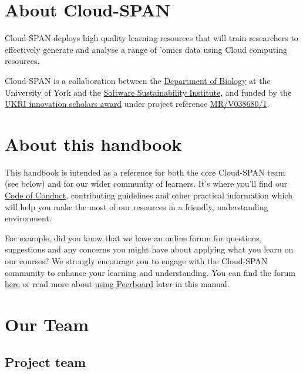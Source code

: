 \documentclass[
]{book}
\begin{document}
\hypertarget{about-cloud-span}{%
\section{About Cloud-SPAN}\label{about-cloud-span}}

Cloud-SPAN deploys high quality learning resources that will train researchers to effectively generate and analyse a range of 'omics data using Cloud computing resources.

Cloud-SPAN is a collaboration between the \href{https://www.york.ac.uk/biology/}{Department of Biology} at the University of York and the \href{https://www.software.ac.uk/}{Software Sustainability Institute}, and funded by the \href{https://www.ukri.org/news/initiatives-boost-health-and-bioscience-skills-and-industry/}{UKRI innovation scholars award} under project reference \href{https://gtr.ukri.org/projects?ref=MR\%2FV038680\%2F1}{MR/V038680/1}.

\hypertarget{about-this-handbook}{%
\section{About this handbook}\label{about-this-handbook}}

This handbook is intended as a reference for both the core Cloud-SPAN team (see below) and for our wider community of learners. It's where you'll find our \protect\hyperlink{code-of-conduct}{Code of Conduct}, contributing guidelines and other practical information which will help you make the most of our resources in a friendly, understanding environment.

For example, did you know that we have an online forum for questions, suggestions and any concerns you might have about applying what you learn on our courses? We strongly encourage you to engage with the Cloud-SPAN community to enhance your learning and understanding. You can find the forum \href{cloudspan.peerboard.com}{here} or read more about \protect\hyperlink{forum}{using Peerboard} later in this manual.

\hypertarget{our-team}{%
\section{Our Team}\label{our-team}}

\hypertarget{project-team}{%
\subsection{Project team}\label{project-team}}
\end{document}
